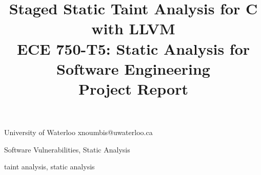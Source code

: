 \documentclass{sigplanconf}
\begin{document}


\title{Staged Static Taint Analysis for C with LLVM\\
	   ECE 750-T5: Static Analysis for Software Engineering\\
	   Project Report}

\date{}

           {University of Waterloo}
           {xnoumbis@uwaterloo.ca}

\maketitle




\terms
Software Vulnerabilities, Static Analysis

\keywords
taint analysis, static analysis















\appendix












\end{document}
